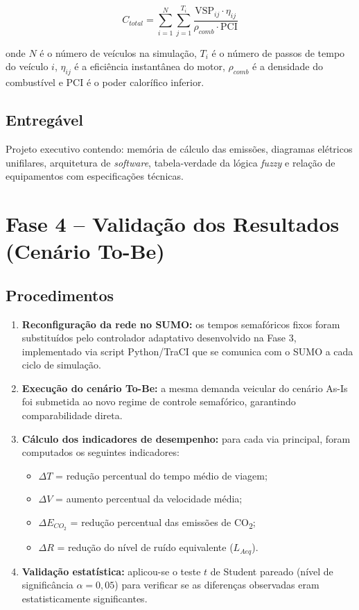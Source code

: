 \documentclass[12pt,a4paper,oneside]{abntex2}
\begin{document}
\begin{equation}
C_{total} = \sum_{i=1}^{N} \sum_{j=1}^{T_i} \frac{\text{VSP}_{ij} \cdot \eta_{ij}}{\rho_{comb} \cdot \text{PCI}}
\label{eq:consumo}
\end{equation}

onde $N$ é o número de veículos na simulação, $T_i$ é o número de passos de tempo do veículo $i$, $\eta_{ij}$ é a eficiência instantânea do motor, $\rho_{comb}$ é a densidade do combustível e PCI é o poder calorífico inferior.

\subsection{Entregável}

Projeto executivo contendo: memória de cálculo das emissões, diagramas elétricos unifilares, arquitetura de \textit{software}, tabela-verdade da lógica \textit{fuzzy} e relação de equipamentos com especificações técnicas.

\section{Fase 4 -- Validação dos Resultados (Cenário To-Be)}

\subsection{Procedimentos}

\begin{enumerate}[label=\textbf{P\arabic*:},leftmargin=2cm]
  \item \textbf{Reconfiguração da rede no SUMO:} os tempos semafóricos fixos foram substituídos pelo controlador adaptativo desenvolvido na Fase 3, implementado via script Python/TraCI que se comunica com o SUMO a cada ciclo de simulação.
  \item \textbf{Execução do cenário To-Be:} a mesma demanda veicular do cenário As-Is foi submetida ao novo regime de controle semafórico, garantindo comparabilidade direta.
  \item \textbf{Cálculo dos indicadores de desempenho:} para cada via principal, foram computados os seguintes indicadores:

  \begin{itemize}
    \item $\Delta T$ = redução percentual do tempo médio de viagem;
    \item $\Delta V$ = aumento percentual da velocidade média;
    \item $\Delta E_{CO_2}$ = redução percentual das emissões de CO\textsubscript{2};
    \item $\Delta R$ = redução do nível de ruído equivalente ($L_{Aeq}$).
  \end{itemize}

  \item \textbf{Validação estatística:} aplicou-se o teste $t$ de Student pareado (nível de significância $\alpha = 0,05$) para verificar se as diferenças observadas eram estatisticamente significantes.
\end{enumerate}
\end{document}
